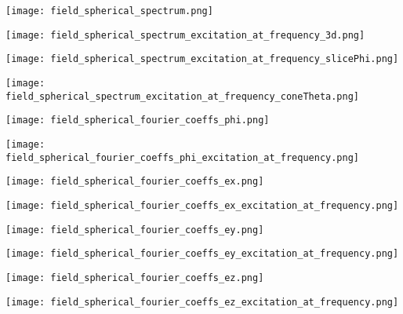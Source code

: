 \documentclass[a4paper]{scrartcl}
\begin{document}
  \texttt{[image: field\_spherical\_spectrum.png]}

  \texttt{[image: field\_spherical\_spectrum\_excitation\_at\_frequency\_3d.png]}

  \texttt{[image: field\_spherical\_spectrum\_excitation\_at\_frequency\_slicePhi.png]}

  \texttt{[image: field\_spherical\_spectrum\_excitation\_at\_frequency\_coneTheta.png]}

  \newpage

  \texttt{[image: field\_spherical\_fourier\_coeffs\_phi.png]}

  \texttt{[image: field\_spherical\_fourier\_coeffs\_phi\_excitation\_at\_frequency.png]}

  \newpage

  \texttt{[image: field\_spherical\_fourier\_coeffs\_ex.png]}

  \texttt{[image: field\_spherical\_fourier\_coeffs\_ex\_excitation\_at\_frequency.png]}

  \newpage

  \texttt{[image: field\_spherical\_fourier\_coeffs\_ey.png]}

  \texttt{[image: field\_spherical\_fourier\_coeffs\_ey\_excitation\_at\_frequency.png]}

  \newpage

  \texttt{[image: field\_spherical\_fourier\_coeffs\_ez.png]}

  \texttt{[image: field\_spherical\_fourier\_coeffs\_ez\_excitation\_at\_frequency.png]}

  \newpage
\end{document}
